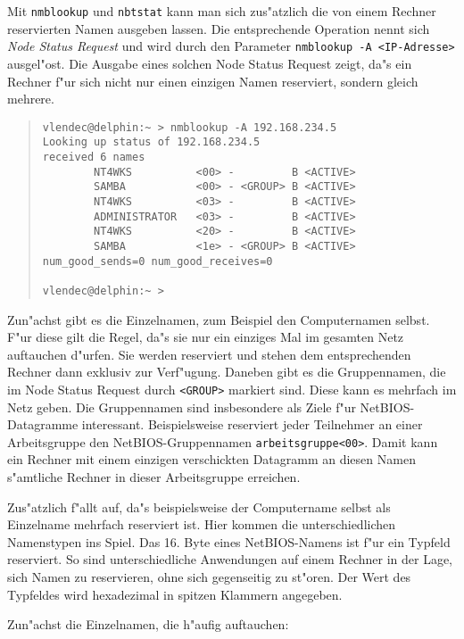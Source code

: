 \documentclass{scrartcl}\usepackage{pslatex}\typearea{12}
\newcommand{\prog}{\texttt}
\newcommand{\nbname}{\texttt}
\newcommand{\defin}{\emph}
\begin{document}
Mit \prog{nmblookup} und \prog{nbtstat} kann man sich zus"atzlich die
von einem Rechner reservierten Namen ausgeben lassen. Die
entsprechende Operation nennt sich \defin{Node Status Request} und
wird durch den Parameter \prog{nmblookup -A <IP-Adresse>} ausgel"ost.
Die Ausgabe eines solchen Node Status Request zeigt, da"s ein Rechner
f"ur sich nicht nur einen einzigen Namen reserviert, sondern gleich
mehrere.

\begin{quote}\begin{small}\begin{verbatim}
vlendec@delphin:~ > nmblookup -A 192.168.234.5
Looking up status of 192.168.234.5
received 6 names
        NT4WKS          <00> -         B <ACTIVE>
        SAMBA           <00> - <GROUP> B <ACTIVE>
        NT4WKS          <03> -         B <ACTIVE>
        ADMINISTRATOR   <03> -         B <ACTIVE>
        NT4WKS          <20> -         B <ACTIVE>
        SAMBA           <1e> - <GROUP> B <ACTIVE>
num_good_sends=0 num_good_receives=0

vlendec@delphin:~ >
\end{verbatim}\end{small}\end{quote}
  
Zun"achst gibt es die Einzelnamen, zum Beispiel den Computernamen
selbst. F"ur diese gilt die Regel, da"s sie nur ein einziges Mal im
gesamten Netz auftauchen d"urfen. Sie werden reserviert und stehen dem
entsprechenden Rechner dann exklusiv zur Verf"ugung. Daneben gibt es
die Gruppennamen, die im Node Status Request durch \texttt{<GROUP>}
markiert sind. Diese kann es mehrfach im Netz geben. Die Gruppennamen
sind insbesondere als Ziele f"ur NetBIOS-Datagramme interessant.
Beispielsweise reserviert jeder Teilnehmer an einer Arbeitsgruppe den
NetBIOS-Gruppennamen \nbname{arbeitsgruppe<00>}. Damit kann ein
Rechner mit einem einzigen verschickten Datagramm an diesen Namen
s"amtliche Rechner in dieser Arbeitsgruppe erreichen.

Zus"atzlich f"allt auf, da"s beispielsweise der Computername selbst
als Einzelname mehrfach reserviert ist. Hier kommen die
unterschiedlichen Namenstypen ins Spiel. Das 16. Byte eines
NetBIOS-Namens ist f"ur ein Typfeld reserviert. So sind
unterschiedliche Anwendungen auf einem Rechner in der Lage, sich Namen
zu reservieren, ohne sich gegenseitig zu st"oren. Der Wert des
Typfeldes wird hexadezimal in spitzen Klammern angegeben.

Zun"achst die Einzelnamen, die h"aufig auftauchen:
\end{document}

